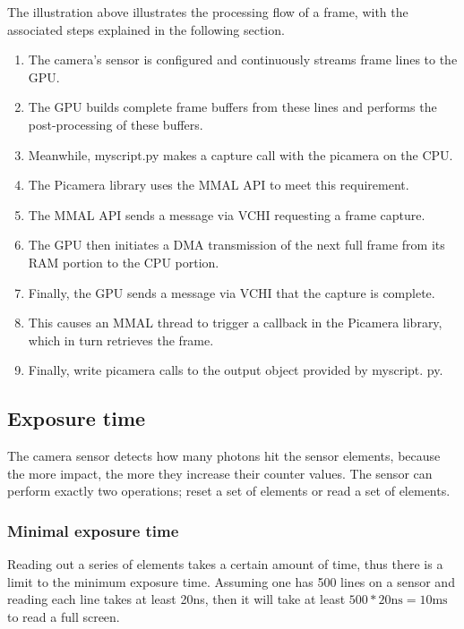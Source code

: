 \documentclass[12pt, a4paper]{report}
\begin{document}
    
    
    \bigskip
    
    The illustration above illustrates the processing flow of a frame, with the associated steps explained in the following section.
    
    \begin{enumerate}
    \item The camera's sensor is configured and continuously streams frame lines to the GPU.
    \item The GPU builds complete frame buffers from these lines and performs the post-processing of these buffers.
    \item Meanwhile, myscript.py makes a capture call with the picamera on the CPU.
    \item The Picamera library uses the MMAL API to meet this requirement.
    \item The MMAL API sends a message via VCHI requesting a frame capture.
    \item The GPU then initiates a DMA transmission of the next full frame from its RAM portion to the CPU portion.
    \item Finally, the GPU sends a message via VCHI that the capture is complete.
    \item This causes an MMAL thread to trigger a callback in the Picamera library, which in turn retrieves the frame.
    \item Finally, write picamera calls to the output object provided by myscript. py.
    \end{enumerate}
    
    \subsection{Exposure time}
    
    The camera sensor detects how many photons hit the sensor elements, because the more impact, the more they increase their counter values. The sensor can perform exactly two operations; reset a set of elements or read a set of elements.
    
    \subsubsection{Minimal exposure time}
    
    Reading out a series of elements takes a certain amount of time, thus there is a limit to the minimum exposure time. Assuming one has 500 lines on a sensor and reading each line takes at least 20ns, then it will take at least $500*20 \text{ns} = 10 \text{ms}$ to read a full screen. 
    
\end{document}
